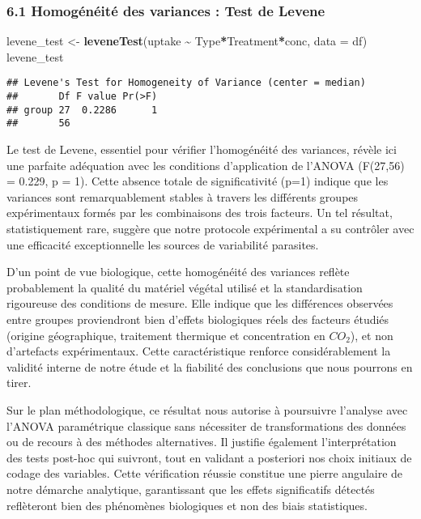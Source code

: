 \documentclass[
]{article}
\newenvironment{Shaded}{\begin{snugshade}}{\end{snugshade}}
\newcommand{\AttributeTok}[1]{\textcolor[rgb]{0.13,0.29,0.53}{#1}}
\newcommand{\FunctionTok}[1]{\textcolor[rgb]{0.13,0.29,0.53}{\textbf{#1}}}
\newcommand{\NormalTok}[1]{#1}
\newcommand{\OtherTok}[1]{\textcolor[rgb]{0.56,0.35,0.01}{#1}}
\newcommand{\SpecialCharTok}[1]{\textcolor[rgb]{0.81,0.36,0.00}{\textbf{#1}}}
\begin{document}
\subsubsection{6.1 Homogénéité des variances : Test de
Levene}\label{homoguxe9nuxe9ituxe9-des-variances-test-de-levene}

\begin{Shaded}
\begin{Highlighting}[]
\NormalTok{levene\_test }\OtherTok{\textless{}{-}} \FunctionTok{leveneTest}\NormalTok{(uptake }\SpecialCharTok{\textasciitilde{}}\NormalTok{ Type}\SpecialCharTok{*}\NormalTok{Treatment}\SpecialCharTok{*}\NormalTok{conc, }\AttributeTok{data =}\NormalTok{ df)}
\NormalTok{levene\_test}
\end{Highlighting}
\end{Shaded}

\begin{verbatim}
## Levene's Test for Homogeneity of Variance (center = median)
##       Df F value Pr(>F)
## group 27  0.2286      1
##       56
\end{verbatim}

Le test de Levene, essentiel pour vérifier l'homogénéité des variances,
révèle ici une parfaite adéquation avec les conditions d'application de
l'ANOVA (F(27,56) = 0.229, p = 1). Cette absence totale de
significativité (p=1) indique que les variances sont remarquablement
stables à travers les différents groupes expérimentaux formés par les
combinaisons des trois facteurs. Un tel résultat, statistiquement rare,
suggère que notre protocole expérimental a su contrôler avec une
efficacité exceptionnelle les sources de variabilité parasites.

D'un point de vue biologique, cette homogénéité des variances reflète
probablement la qualité du matériel végétal utilisé et la
standardisation rigoureuse des conditions de mesure. Elle indique que
les différences observées entre groupes proviendront bien d'effets
biologiques réels des facteurs étudiés (origine géographique, traitement
thermique et concentration en \(CO_2\)), et non d'artefacts
expérimentaux. Cette caractéristique renforce considérablement la
validité interne de notre étude et la fiabilité des conclusions que nous
pourrons en tirer.

Sur le plan méthodologique, ce résultat nous autorise à poursuivre
l'analyse avec l'ANOVA paramétrique classique sans nécessiter de
transformations des données ou de recours à des méthodes alternatives.
Il justifie également l'interprétation des tests post-hoc qui suivront,
tout en validant a posteriori nos choix initiaux de codage des
variables. Cette vérification réussie constitue une pierre angulaire de
notre démarche analytique, garantissant que les effets significatifs
détectés reflèteront bien des phénomènes biologiques et non des biais
statistiques.
\end{document}
